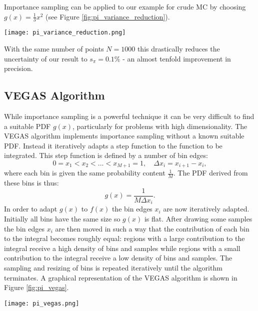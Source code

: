 Importance sampling can be applied to our example for crude MC by choosing $g(x) = \frac{1}{3} x^2$
(see Figure \ref{fig:pi_variance_reduction}).
\begin{figure*}
	\centering
	\texttt{[image: pi\_variance\_reduction.png]}
	\caption{
		Visualization of crude MC with variance reduction.
		The ratio of $f(x)$ and $g(x)$ is much flatter than the individual functions.
		Samples concentrate towards high $x$ values where $g(x)$ is high.
	}
	\label{fig:pi_variance_reduction}
\end{figure*}
With the same number of points $N = 1000$ this drastically reduces the uncertainty of our result to $s_\pi = 0.1\%$
- an almost tenfold improvement in precision.
\subsection{VEGAS Algorithm}
While importance sampling is a powerful technique it can be very difficult to find a suitable PDF $g(x)$,
particularly for problems with high dimensionality.
The VEGAS algorithm implements importance sampling without a known suitable PDF.
Instead it iteratively adapts a step function to the function to be integrated.
This step function is defined by a number of bin edges:
\begin{equation}
	0=x_1<x_2 < ... < x_{M+1}=1, \quad \Delta x_i = x_{i+1} - x_{i},
\end{equation}
where each bin is given the same probability content $\frac{1}{M}$.
The PDF derived from these bins is thus:
\begin{equation}
	g(x) = \frac{1}{M \Delta x_i}.
\end{equation}
In order to adapt $g(x)$ to $f(x)$ the bin edges $x_i$ are now iteratively adapted.
Initially all bins have the same size so $g(x)$ is flat.
After drawing some samples the bin edges $x_i$ are then moved in such a way that the contribution
of each bin to the integral becomes roughly equal:
regions with a large contribution to the integral receive a high density of bins and samples
while regions with a small contribution to the integral receive a low density of bins and samples.
The sampling and resizing of bins is repeated iteratively until the algorithm terminates.
A graphical representation of the VEGAS algorithm is shown in Figure \ref{fig:pi_vegas}.
\begin{figure*}
	\centering
	\texttt{[image: pi\_vegas.png]}
	\caption{
		Visualization of the VEGAS algorithm with 3 iterations.
		The PDF $g(x)$ is initially flat.
		In the second and third iterations the shape of $g(x)$ is much closer shape of $f(x)$.
	}
	\label{fig:pi_vegas}
\end{figure*}
